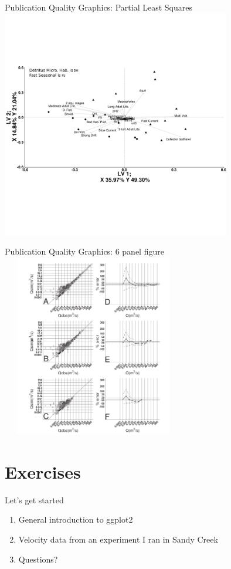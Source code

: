 \documentclass[t,10pt]{beamer}
\begin{document}
\begin{frame}[label={sec:orgheadline20}]{Publication Quality Graphics: Partial Least Squares}
\includegraphics[width=10cm,height=10cm]{./bug.pls.out.png}
\end{frame}

\begin{frame}[label={sec:orgheadline21}]{Publication Quality Graphics: 6 panel figure}
\includegraphics[width=8cm,height=8cm]{./hhydrology.png}
\end{frame}


\section{Exercises}
\label{sec:orgheadline24}
\begin{frame}[label={sec:orgheadline23}]{Let's get started}
\begin{enumerate}
\item General introduction to ggplot2

\item Velocity data from an experiment I ran in Sandy Creek

\item \alert{Questions?}
\end{enumerate}
\end{frame}
\end{document}
